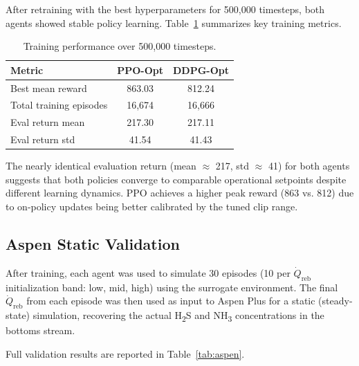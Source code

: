 \documentclass[journal,10pt,twocolumn]{IEEEtran}
\begin{document}
After retraining with the best hyperparameters for 500,000 timesteps, both agents showed stable policy learning. Table~\ref{tab:training} summarizes key training metrics.

\begin{table}[h]
  \centering
  \caption{Training performance over 500,000 timesteps.}
  \label{tab:training}
  \begin{tabular}{lcc}
    \toprule
    Metric & PPO-Opt & DDPG-Opt \\
    \midrule
    Best mean reward & 863.03 & 812.24 \\
    Total training episodes & 16,674 & 16,666 \\
    Eval return mean & 217.30 & 217.11 \\
    Eval return std  & 41.54  & 41.43  \\
    \bottomrule
  \end{tabular}
\end{table}

The nearly identical evaluation return (mean $\approx$ 217, std $\approx$ 41) for both agents suggests that both policies converge to comparable operational setpoints despite different learning dynamics. PPO achieves a higher peak reward (863 vs. 812) due to on-policy updates being better calibrated by the tuned clip range.

\subsection{Aspen Static Validation}
\label{ssec:aspen}

After training, each agent was used to simulate 30 episodes (10 per $\dot{Q}_\text{reb}$ initialization band: low, mid, high) using the surrogate environment. The final $\dot{Q}_\text{reb}$ from each episode was then used as input to Aspen Plus for a static (steady-state) simulation, recovering the actual H\textsubscript{2}S and NH\textsubscript{3} concentrations in the bottoms stream.

Full validation results are reported in Table~\ref{tab:aspen}.
\end{document}
